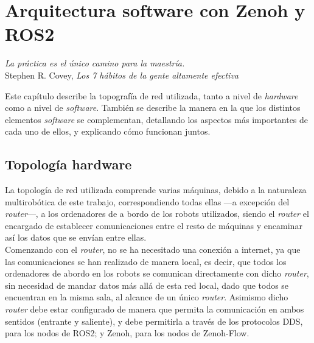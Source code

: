 \chapter{Arquitectura software con Zenoh y ROS2}
\label{cap:capitulo4}

\begin{flushright}
\emph{La práctica es el único camino para la maestría.}\\

Stephen R. Covey, \textit{Los 7 hábitos de la gente altamente efectiva}\\
\end{flushright}

\vspace{1cm}


Este capítulo describe la topografía de red utilizada, tanto a nivel de
\textit{hardware} como a nivel de \textit{software}.
También se describe la manera en la que los distintos elementos
\textit{software} se complementan, detallando los aspectos más importantes de
cada uno de ellos, y explicando cómo funcionan juntos.



\section{Topología hardware}
\label{sec:topologia_hw}

La topología de red utilizada comprende varias máquinas, debido a la naturaleza
multirobótica de este trabajo, correspondiendo todas ellas ---a excepción del
\textit{router}---, a los ordenadores de a bordo de los robots utilizados, siendo
el \textit{router} el encargado de establecer comunicaciones entre el resto de
máquinas y encaminar así los datos que se envían entre ellas.
\\

Comenzando con el \textit{router}, no se ha necesitado una conexión a internet,
ya que las comunicaciones se han realizado de manera local, es decir, que todos
los ordenadores de abordo en los robots se comunican directamente con dicho
\textit{router}, sin necesidad de mandar datos más allá de esta red local,
dado que todos se encuentran en la misma sala, al alcance de un único
\textit{router}.
Asimismo dicho \textit{router} debe estar configurado de manera que permita la
comunicación en ambos sentidos (entrante y saliente), y debe permitirla a través
de los protocolos DDS, para los nodos de ROS2; y Zenoh, para los nodos de
Zenoh-Flow.
\\

